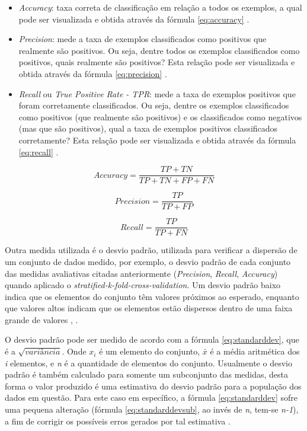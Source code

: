 \begin{itemize}
\item \textit{Accuracy}: taxa correta de classificação em relação a todos os exemplos, a qual pode ser visualizada e obtida através da fórmula \ref{eq:accuracy} \cite{Metz:1978}.
\item \textit{Precision}: mede a taxa de exemplos classificados como positivos que realmente são positivos. Ou seja, dentre todos os exemplos classificados como positivos, quais realmente são positivos? Esta relação pode ser visualizada e obtida através da fórmula \ref{eq:precision} \cite{Davis:2006}.
\item \textit{Recall} ou \textit{True Positive Rate - TPR}: mede a taxa de exemplos positivos que foram corretamente classificados. Ou seja, dentre os exemplos classificados como positivos (que realmente são positivos) e os classificados como negativos (mas que são positivos), qual a taxa de exemplos positivos classificados corretamente?  Esta relação pode ser visualizada e obtida através da fórmula \ref{eq:recall} \cite{Davis:2006}.
\end{itemize}

\begin{equation} 
  Accuracy = \frac{TP+TN}{TP+TN+FP+FN} 
  \label{eq:accuracy}
\end{equation}

\begin{equation} 
  Precision = \frac{TP}{TP+FP}
  \label{eq:precision}
\end{equation}

\begin{equation} 
  Recall = \frac{TP}{TP+FN} 
  \label{eq:recall}
\end{equation}

Outra medida utilizada é o desvio padrão, utilizada para verificar a dispersão de um conjunto de dados medido, por exemplo, o desvio padrão de cada conjunto das medidas avaliativas citadas anteriormente (\textit{Precision}, \textit{Recall}, \textit{Accuracy}) quando aplicado o \textit{stratified-k-fold-cross-validation}. Um desvio padrão baixo indica que os elementos do conjunto têm valores próximos ao esperado, enquanto que valores altos indicam que os elementos estão dispersos dentro de uma faixa grande de valores \cite{Kerr:2002}, \cite{Bland:1996}.

O desvio padrão pode ser medido de acordo com a fórmula \ref{eq:standarddev}, que é a $\sqrt{variância}$. Onde $x_{i}$ é um elemento do conjunto, $\bar{x}$ é a média aritmética dos \textit{i} elementos, e \textit{n} é a quantidade de elementos do conjunto. Usualmente o desvio padrão é também calculado para somente um subconjunto das medidas, desta forma o valor produzido é uma estimativa do desvio padrão para a população dos dados em questão. Para este caso em específico, a fórmula \ref{eq:standarddev} sofre uma pequena alteração (fórmula \ref{eq:standarddevsub}, ao  invés de \textit{n}, tem-se \textit{n-1}), a fim de corrigir os possíveis erros gerados por tal estimativa \cite{Kerr:2002}.

